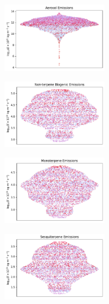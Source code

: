 \begin{figure}[H]
    \centering
    \begin{subfigure}
        \centering
        \includegraphics[width=0.49\textwidth,valign=t]{sosaa-data/figures/trajectories/trajectory-14.05.2018:10.00-aerosols.pdf}
    \end{subfigure}
    \begin{subfigure}
        \centering
        \includegraphics[width=0.49\textwidth,valign=t]{sosaa-data/figures/trajectories/trajectory-14.05.2018:10.00-biogenic.pdf}
    \end{subfigure}
    
    \begin{subfigure}
        \centering
        \includegraphics[width=0.49\textwidth,valign=t]{sosaa-data/figures/trajectories/trajectory-14.05.2018:10.00-monoterpenes.pdf}
    \end{subfigure}
    \begin{subfigure}
        \centering
        \includegraphics[width=0.49\textwidth,valign=t]{sosaa-data/figures/trajectories/trajectory-14.05.2018:10.00-sesquiterpenes.pdf}
    \end{subfigure}


\end{figure}
